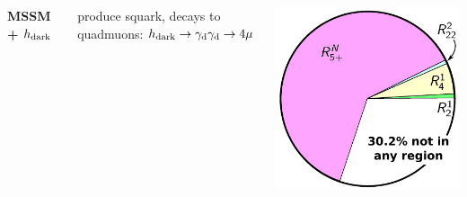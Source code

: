 \documentclass[compress]{beamer}
\newcommand{\s}[1]{{\mbox{\scriptsize #1}}}
\begin{document}
\begin{frame}
\begin{columns}
{\bf MSSM + $h_\s{dark}$}

produce squark, decays to quadmuons: \mbox{$h_\s{dark} \to \gamma_\s{d}\gamma_\s{d} \to 4\mu$\hspace{-1 cm}}

\includegraphics[width=\linewidth]{pie_higgsdark.pdf}
\end{columns}
\end{frame}
\end{document}
